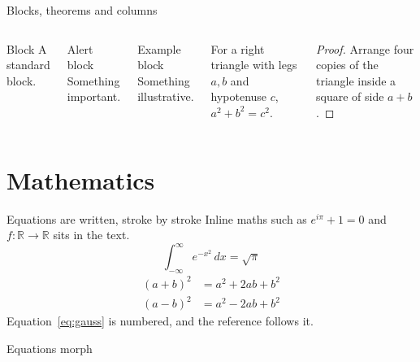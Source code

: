 \documentclass{beamer}
\newcommand{\R}{\mathbb{R}}
\begin{document}
\begin{frame}{Blocks, theorems and columns}
  \begin{columns}[T]
      \begin{block}{Block}
        A standard block.
      \end{block}
      \begin{alertblock}{Alert block}
        Something important.
      \end{alertblock}
      \begin{exampleblock}{Example block}
        Something illustrative.
      \end{exampleblock}
      \pause
      \begin{theorem}[Pythagoras]
        For a right triangle with legs $a, b$ and hypotenuse $c$, $a^2 + b^2 = c^2$.
      \end{theorem}
      \pause
      \begin{proof}
        Arrange four copies of the triangle inside a square of side $a + b$.
      \end{proof}
  \end{columns}
\end{frame}

\section{Mathematics}

\begin{frame}{Equations are written, stroke by stroke}
  Inline maths such as $e^{i\pi} + 1 = 0$ and $f\colon \R \to \R$ sits in the text.
  \pause
  \begin{equation}\label{eq:gauss}
    \int_{-\infty}^{\infty} e^{-x^2}\,dx = \sqrt{\pi}
  \end{equation}
  \pause
  \begin{align*}
    (a + b)^2 &= a^2 + 2ab + b^2 \\
    (a - b)^2 &= a^2 - 2ab + b^2
  \end{align*}
  \pause
  Equation~\eqref{eq:gauss} is numbered, and the reference follows it.
\end{frame}

\begin{frame}{Equations morph}
\begin{scene}[size={16,5}]
  \pause
  \pause
  \pause
\end{scene}
\end{frame}
\end{document}
